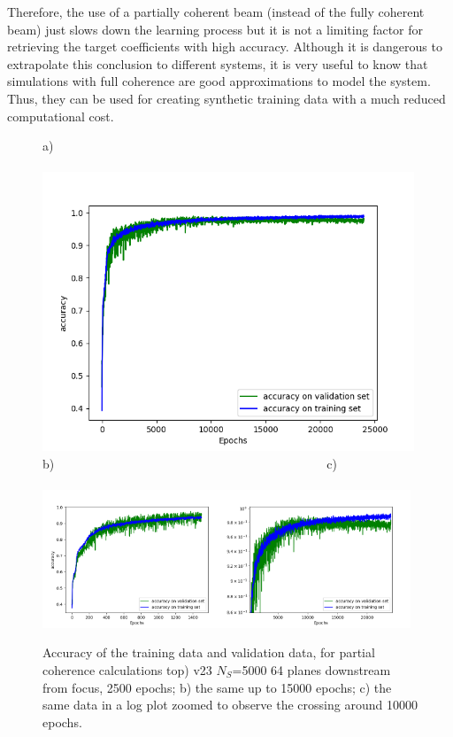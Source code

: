 \documentclass{iucr}
\begin{document}
Therefore, the use of a partially coherent beam (instead of the fully coherent beam) just slows down the learning process but it is not a limiting factor for retrieving the target coefficients with high accuracy. Although it is dangerous to extrapolate this conclusion to different systems, it is very useful to know that simulations with full coherence are good approximations to model the system. Thus, they can be used for creating synthetic training data with a much reduced computational cost. 

 
\begin{figure}\label{fig:v20}
    a)~~~~~~~~~~~~~~~~~~~~~~~~~~~~~~~~~~~~~~~~~~~~~~~~~~~~~~~~~~~~~~~~~~~~~~~~~~~~~~~\\
    \includegraphics[width=0.99\textwidth]{figures/v23.png}
    b)~~~~~~~~~~~~~~~~~~~~~~~~~~~~~~~~~~~~~~~~~~~~c)~~~~~~~~~~~~~~~~~~~~~~~~~~~~~~~~~~~~\\
    \includegraphics[width=0.49\textwidth]{figures/v20.png}\includegraphics[width=0.49\textwidth]{figures/v23z.png}
    \caption{Accuracy of the training data and validation data, for partial coherence calculations top) v23 $N_S$=5000 64 planes downstream from focus, 2500 epochs;
    b) the same up to 15000 epochs; c) the same data in a log plot zoomed to observe the crossing around 10000 epochs.
    }
\end{figure}
\end{document}
